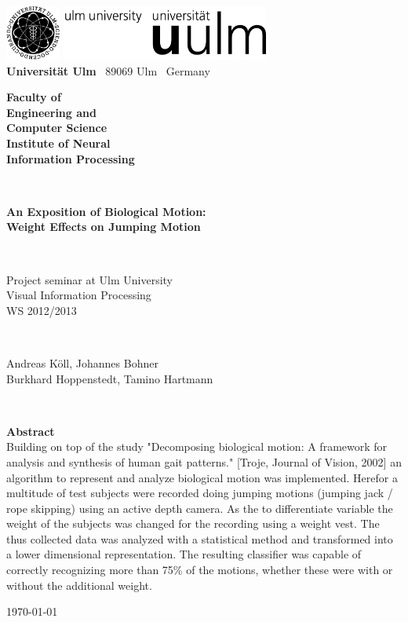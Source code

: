 \documentclass[a4paper]{article}
\begin{document}
\begin{titlepage}
\thispagestyle{empty}


\includegraphics[height=1.8cm]{unilogo_bild}
\hfill
\includegraphics[height=1.8cm]{unilogo_wort}\\[1em]


{\bfseries Universität Ulm} \textbar ~89069 Ulm \textbar ~Germany
\hspace*{38mm}\parbox[t]{38mm}{\bfseries Faculty of \\ Engineering and\\Computer Science\\
\mdseries Institute of Neural\\Information Processing}\\[2cm]

\parbox{140mm}{\bfseries \huge An Exposition of Biological Motion:\\ Weight Effects on Jumping Motion}\\[0.5em]

\parbox{140mm}{Project seminar at Ulm University\\Visual Information Processing \\ WS 2012/2013}\\[3em]

\parbox{140mm}{Andreas Köll, Johannes Bohner \\ Burkhard Hoppenstedt, Tamino Hartmann}\\[4em]



\parbox{140mm}{
{\bfseries\large Abstract}\\
Building on top of the study "Decomposing biological motion: A framework for analysis and synthesis of human gait patterns." [Troje, Journal of Vision, 2002] an algorithm to represent and analyze biological motion was implemented.
Herefor a multitude of test subjects were recorded doing jumping motions (jumping jack / rope skipping) using an active depth camera.
As the to differentiate variable the weight of the subjects was changed for the recording using a weight vest.
The thus collected data was analyzed with a statistical method and transformed into a lower dimensional representation.
The resulting classifier was capable of correctly recognizing more than 75\% of the motions, whether these were with or without the additional weight.
}
\vfill

\parbox{140mm}{\today}



\end{titlepage}
\end{document}
